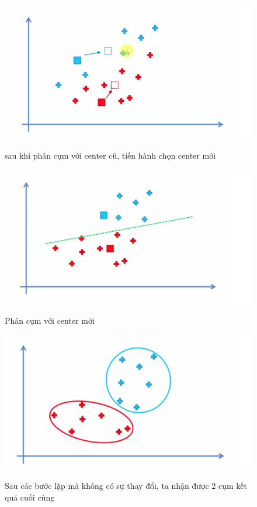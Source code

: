 \documentclass[a4paper,14pt]{extreport}
\begin{document}
\begin{figure}  
    \centering
    \includegraphics[scale=0.6]{img/kmean-4.png}
    \caption{sau khi phân cụm với center cũ, tiến hành chọn center mới}
    \cite{kmean}
    \label{fig:kmean-choosenewcenter}
\end{figure}
\begin{figure}  
    \centering
    \includegraphics[scale=0.6]{img/kmean-5.png}
    \caption{Phân cụm với center mới}
    \cite{kmean}
    \label{fig:kmean-newclus}
\end{figure}
\begin{figure}  
    \centering
    \includegraphics[scale=0.6]{img/kmean-6.png}
    \caption{Sau các bước lặp mà không có sự thay đổi, ta nhận được 2 cụm kết quả cuối cùng}
    \cite{kmean}
    \label{fig:kmean-finalResult}
\end{figure}
\end{document}

